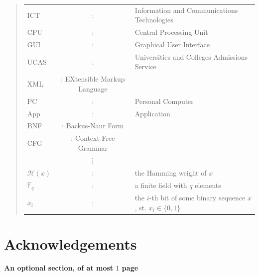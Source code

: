 \documentclass[ %
                    author={Jonathan Rankin},
                supervisor={Dr. David May, Dr. Ian Holyer},
                    degree={MEng},
                     title={CodeTouch},
                  subtitle={A Revolutionary Way To Program Real Code On Touch Screen Devices},
                      type={enterprise},
                      year={2015 } ]{dissertation}
\begin{document}
\begin{quote}
\noindent
\begin{tabular}{lcl}
ICT               &:     & Information and Communications Technologies                                        \\
CPU                &:     & Central Processing Unit                                            \\
GUI            &:     & Graphical User Interface                                      \\
UCAS           &:     & Universities and Colleges Admissions Service \\
XML           &:    EXtensible Markup Language \\
PC       &:     & Personal Computer \\
App      &:     & Application \\
BNF   &: Backus-Naur Form \\
CFG   &: Context Free Grammar\\
                    &\vdots&                                                                      \\
${\mathcal H}( x )$ &:     & the Hamming weight of $x$                                            \\
${\mathbb  F}_q$    &:     & a finite field with $q$ elements                                     \\
$x_i$               &:     & the $i$-th bit of some binary sequence $x$, st. $x_i \in \{ 0, 1 \}$ \\
\end{tabular}
\end{quote}


\chapter*{Acknowledgements}

{\bf An optional section, of at most $1$ page}
\vspace{1cm} 

\noindent



%
\end{document}
